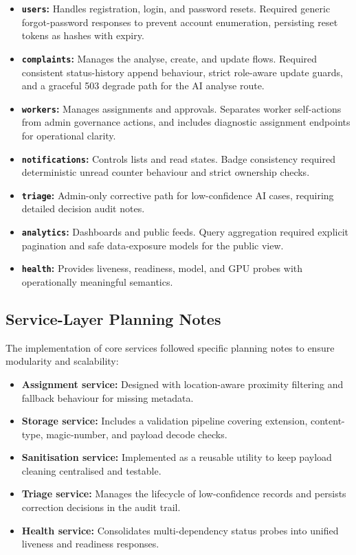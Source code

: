 \begin{itemize}
\item \textbf{\texttt{users}:} Handles registration, login, and password resets. Required generic forgot-password responses to prevent account enumeration, persisting reset tokens as hashes with expiry.
\item \textbf{\texttt{complaints}:} Manages the analyse, create, and update flows. Required consistent status-history append behaviour, strict role-aware update guards, and a graceful 503 degrade path for the AI analyse route.
\item \textbf{\texttt{workers}:} Manages assignments and approvals. Separates worker self-actions from admin governance actions, and includes diagnostic assignment endpoints for operational clarity.
\item \textbf{\texttt{notifications}:} Controls lists and read states. Badge consistency required deterministic unread counter behaviour and strict ownership checks.
\item \textbf{\texttt{triage}:} Admin-only corrective path for low-confidence AI cases, requiring detailed decision audit notes.
\item \textbf{\texttt{analytics}:} Dashboards and public feeds. Query aggregation required explicit pagination and safe data-exposure models for the public view.
\item \textbf{\texttt{health}:} Provides liveness, readiness, model, and GPU probes with operationally meaningful semantics.
\end{itemize}

\subsection{Service-Layer Planning Notes}

The implementation of core services followed specific planning notes to ensure modularity and scalability:

\begin{itemize}
\item \textbf{Assignment service:} Designed with location-aware proximity filtering and fallback behaviour for missing metadata.
\item \textbf{Storage service:} Includes a validation pipeline covering extension, content-type, magic-number, and payload decode checks.
\item \textbf{Sanitisation service:} Implemented as a reusable utility to keep payload cleaning centralised and testable.
\item \textbf{Triage service:} Manages the lifecycle of low-confidence records and persists correction decisions in the audit trail.
\item \textbf{Health service:} Consolidates multi-dependency status probes into unified liveness and readiness responses.
\end{itemize}

